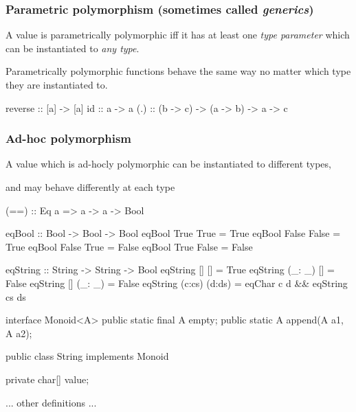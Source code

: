\documentclass[usenames,dvipsnames,svgnames,table,aspectratio=169,mathserif]{beamer}
\newcommand{\nl}{\vspace{\baselineskip}}
\newcommand{\pnl}{\pause \nl}
\begin{document}
\begin{frame}[fragile]

\frametitle{Parametric polymorphism (sometimes called {\it generics})}

A value is parametrically polymorphic iff it has at least one {\it type parameter}
which can be instantiated to {\it any type}.

\nl

Parametrically polymorphic functions behave the same way no matter which type
they are instantiated to.

\pnl

\begin{code}
reverse :: [a] -> [a]
id :: a -> a
(.) :: (b -> c) -> (a -> b) -> a -> c
\end{code}

\end{frame}


\begin{frame}[fragile]
\frametitle{Ad-hoc polymorphism}

A value which is ad-hocly polymorphic can be instantiated to different types,

and may behave differently at each type

\end{frame}


\begin{frame}[fragile]

\begin{code}
(==) :: Eq a => a -> a -> Bool
\end{code}

\pnl

\begin{code}
eqBool :: Bool -> Bool -> Bool
eqBool True True   = True
eqBool False False = True
eqBool False True  = False
eqBool True False  = False
\end{code}

\pnl

\begin{code}
eqString :: String -> String -> Bool
eqString []      []     = True
eqString (_: _)  []     = False
eqString []      (_: _) = False
eqString (c:cs)  (d:ds) = eqChar c d && eqString cs ds
\end{code}

\end{frame}


\begin{frame}[fragile]
\begin{java}
interface Monoid<A> {
  public static final A empty;
  public static A append(A a1, A a2);
}
\end{java}
\end{frame}


\begin{frame}[fragile]
\begin{java}
public class String implements Monoid {
  private char[] value;

  ... other definitions ...


}
\end{java}
\end{frame}
\end{document}
